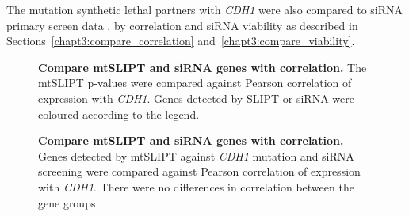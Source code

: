 The mutation synthetic lethal partners with \textit{CDH1} were also compared to \gls{siRNA} primary screen data \citep{Telford2015}, by correlation and \gls{siRNA} viability as described in Sections~\ref{chapt3:compare_correlation} and~\ref{chapt3:compare_viability}.

\begin{figure}[!htp]
\begin{center}
   \end{center}
   \caption[Compare \acrshort{mtSLIPT} and \gls{siRNA} genes with correlation]{\small \textbf{Compare \acrshort{mtSLIPT} and \gls{siRNA} genes with correlation.} The \acrshort{mtSLIPT} p-values were compared against Pearson correlation of expression with \textit{CDH1}. Genes detected by SLIPT or \gls{siRNA} were coloured according to the legend. 
}
\label{fig:compare_points_correlation_mtSL}

\begin{center}
   \end{center}
   \caption[Compare \acrshort{mtSLIPT} and \gls{siRNA} genes with correlation]{\small \textbf{Compare \acrshort{mtSLIPT} and \gls{siRNA} genes with correlation.}  Genes detected by \acrshort{mtSLIPT} against \textit{CDH1} mutation and \gls{siRNA} screening were compared against Pearson correlation of expression with \textit{CDH1}. There were no differences in correlation between the gene groups. 
}
\label{fig:compare_correlation_mtSL}
\end{figure}

